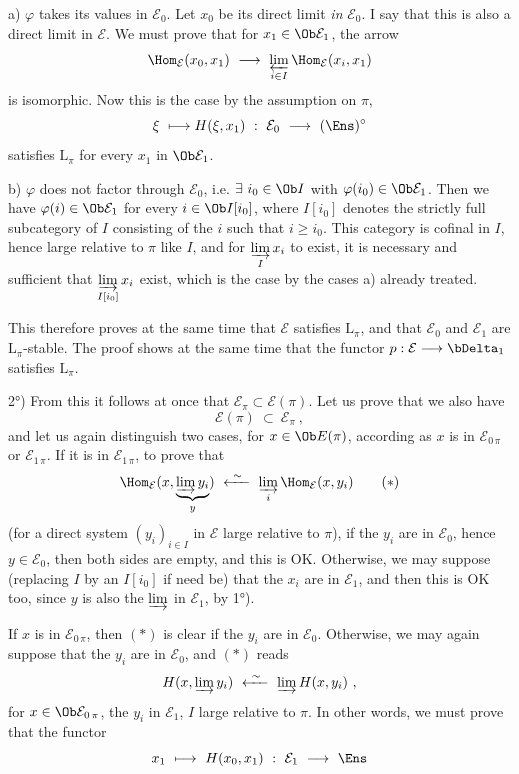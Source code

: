 a) $\varphi$ takes its values in $\mathcal{E}_0$. Let $x_0$ be its direct limit \textit{in} $\mathcal{E}_0$. I say that this is also a direct limit in $\mathcal{E}$. We must prove that for $x_1\in\Ob\mathcal{E}_1$, the arrow
\[
\Hom_{\mathcal{E}}(x_0,x_1)\ \longrightarrow\ \varprojlim_{i\in I}\Hom_{\mathcal{E}}(x_i,x_1)
\]
is isomorphic. Now this is the case
by the assumption on $\pi$,
\[
\xi\ \longmapsto H(\xi,x_1)\ :\ \mathcal{E}_0\ \longrightarrow\ (\Ens)^{\circ}
\]
satisfies $\mathrm{L}_\pi$ for every $x_1$ in $\Ob\mathcal{E}_1$.

b) $\varphi$ does not factor through $\mathcal{E}_0$, i.e. $\exists\ i_0\in\Ob I$ with $\varphi(i_0)\in\Ob\mathcal{E}_1$. Then we have $\varphi(i)\in\Ob\mathcal{E}_1$ for every $i\in\Ob I[i_0]$, where $I[i_0]$ denotes the strictly full subcategory of $I$ consisting of the $i$ such that $i\geqslant i_0$. This category is cofinal in $I$, hence large relative to $\pi$ like $I$, and for $\varinjlim\limits_{I}x_i$ to exist, it is necessary and sufficient that $\varinjlim\limits_{I[i_0]}x_i$ exist, which is the case by the cases a) already treated. %

This therefore proves at the same time that $\mathcal{E}$ satisfies $\mathrm{L}_\pi$, and that $\mathcal{E}_0$ and $\mathcal{E}_1$ are $\mathrm{L}_\pi$-stable. The proof shows at the same time that the functor $p:\mathcal{E}\longrightarrow\bDelta_1$ satisfies $\mathrm{L}_\pi$.

2°) From this it follows at once that $\mathcal{E}_\pi\subset\mathcal{E}(\pi)$. Let us prove that we also have
\[
\mathcal{E}(\pi)\ \subset\ \mathcal{E}_\pi\ ,
\]
and let us again distinguish two cases, for
$x\in\Ob E(\pi)$, according as $x$ is in $\mathcal{E}_{0\,\pi}$ or $\mathcal{E}_{1\,\pi}$. If it is in $\mathcal{E}_{1\,\pi}$, to prove that %
\[
\Hom_{\mathcal{E}}(x,\underbrace{\varinjlim y_i}_{y})\ \xleftarrow{\ \sim\ }\ \varinjlim_{i}\Hom_{\mathcal{E}}(x,y_i)
\tag*{$(*)$}
\]
(for a direct system $(y_i)_{i\in I}$ in $\mathcal{E}$ large relative to $\pi$), if the $y_i$ are in $\mathcal{E}_0$, hence $y\in\mathcal{E}_0$, then both sides are empty, and this is OK. Otherwise, we may suppose (replacing $I$ by an $I[i_0]$ if need be) that the $x_i$ are in $\mathcal{E}_1$, and then this is OK too, since $y$ is also the $\varinjlim$ in $\mathcal{E}_1$, by 1°). %

If $x$ is in $\mathcal{E}_{0\,\pi}$, then $(*)$ is clear if the $y_i$ are in $\mathcal{E}_0$. Otherwise, we may again suppose that the $y_i$ are in $\mathcal{E}_0$, and $(*)$ reads %
\[
H(x,\varinjlim y_i)\ \xleftarrow{\ \sim\ }\ \varinjlim H(x,y_i)\ ,
\]
for $x\in\Ob\mathcal{E}_{0\,\pi}$, the $y_i$ in $\mathcal{E}_1$, $I$ large relative to $\pi$. In other words, we must prove that the functor
\[
x_1\ \longmapsto\ H(x_0,x_1)\ :\ \mathcal{E}_1\ \longrightarrow\ \Ens
\]
